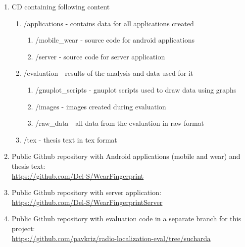 \label{sec:Attachments}
\begin{enumerate}
	\item CD containing following content
	\begin{enumerate}
		\item /applications - contains data for all applications created
		\begin{enumerate}
			\item /mobile\_wear - source code for android applications
			\item /server - source code for server application
		\end{enumerate}
		\item /evaluation - results of the analysis and data used for it
		\begin{enumerate}
			\item /gnuplot\_scripts - gnuplot scripts used to draw data using graphs
			\item /images - images created during evaluation
			\item /raw\_data - all data from the evaluation in raw format
		\end{enumerate}
		\item /tex - thesis text in tex format
	\end{enumerate}
	\item Public Github repository with Android applications (mobile and wear) and thesis text:
	\\ \url{https://github.com/Del-S/WearFingerprint}
	\item Public Github repository with server application:
	\\ \url{https://github.com/Del-S/WearFingerprintServer}
	\item Public Github repository with evaluation code in a separate branch for this project:
	\\ \url{https://github.com/pavkriz/radio-localization-eval/tree/sucharda}
\end{enumerate}